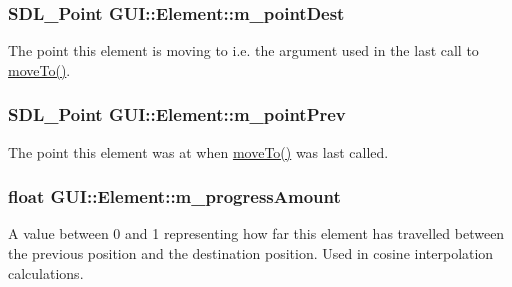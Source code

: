 \hypertarget{classGUI_1_1Element_a10ec38c0cf88fddea487644c1de45e1e}{
\subsubsection[{m\-\_\-point\-Dest}]{\setlength{\rightskip}{0pt plus 5cm}S\-D\-L\-\_\-\-Point G\-U\-I\-::\-Element\-::m\-\_\-point\-Dest\hspace{0.3cm}{\ttfamily [protected]}}}\label{classGUI_1_1Element_a10ec38c0cf88fddea487644c1de45e1e}


The point this element is moving to i.\-e. the argument used in the last call to \hyperlink{classGUI_1_1Element_a6f7171736744f64faf428c17c74695df}{move\-To()}. 

\hypertarget{classGUI_1_1Element_abc7a9c575911f5260732cdb0d63afb58}{
\subsubsection[{m\-\_\-point\-Prev}]{\setlength{\rightskip}{0pt plus 5cm}S\-D\-L\-\_\-\-Point G\-U\-I\-::\-Element\-::m\-\_\-point\-Prev\hspace{0.3cm}{\ttfamily [protected]}}}\label{classGUI_1_1Element_abc7a9c575911f5260732cdb0d63afb58}


The point this element was at when \hyperlink{classGUI_1_1Element_a6f7171736744f64faf428c17c74695df}{move\-To()} was last called. 

\hypertarget{classGUI_1_1Element_ae695e5eedb37b27ef5d8542a15908f1e}{
\subsubsection[{m\-\_\-progress\-Amount}]{\setlength{\rightskip}{0pt plus 5cm}float G\-U\-I\-::\-Element\-::m\-\_\-progress\-Amount\hspace{0.3cm}{\ttfamily [protected]}}}\label{classGUI_1_1Element_ae695e5eedb37b27ef5d8542a15908f1e}


A value between 0 and 1 representing how far this element has travelled between the previous position and the destination position. Used in cosine interpolation calculations. 

